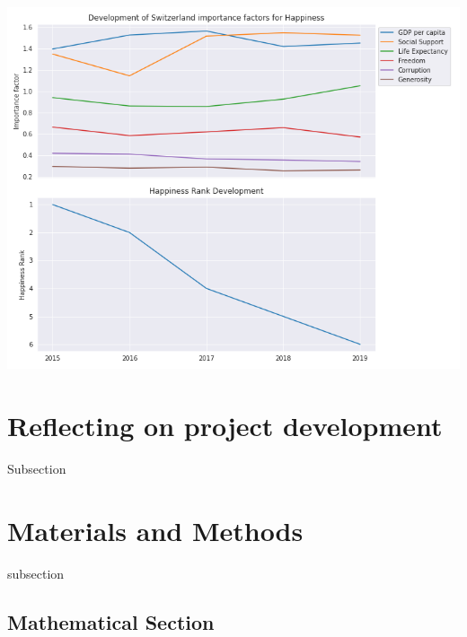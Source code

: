 \documentclass[a0,portrait]{a0poster}
\begin{document}
\begin{multicols}{2}
\begin{center}\vspace{1cm}
	\includegraphics[width=0.8\linewidth]{figures/Switzerland}
\end{center}\vspace{1cm}

\color{DarkSlateGray} %

\section*{Reflecting on project development}

Subsection


\section*{Materials and Methods}

subsection


\subsection*{Mathematical Section}


\end{multicols}
\end{document}
